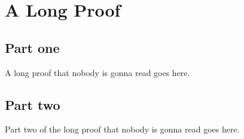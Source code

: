 \section{A Long Proof}
\label{app:long_proof}

\subsection{Part one}
A long proof that nobody is gonna read goes here.

\subsection{Part two}
Part two of the long proof that nobody is gonna read goes here.
\Blindtext[1]

